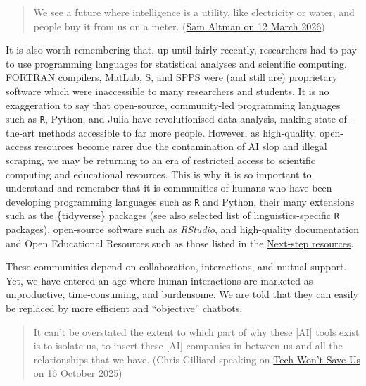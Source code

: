 \documentclass[
  letterpaper,
  DIV=11,
  numbers=noendperiod]{scrreprt}
\begin{document}
\begin{quote}
We see a future where intelligence is a utility, like electricity or
water, and people buy it from us on a meter.
(\href{https://www.youtube.com/watch?v=IWqve2SlIeY&t=350s}{Sam Altman on
12 March 2026})
\end{quote}

It is also worth remembering that, up until fairly recently, researchers
had to pay to use programming languages for statistical analyses and
scientific computing. FORTRAN compilers, MatLab, S, and SPPS were (and
still are) proprietary software which were inaccessible to many
researchers and students. It is no exaggeration to say that open-source,
community-led programming languages such as \texttt{R}, Python, and
Julia have revolutionised data analysis, making state-of-the-art methods
accessible to far more people. However, as high-quality, open-access
resources become rarer due the contamination of AI slop and illegal
scraping, we may be returning to an era of restricted access to
scientific computing and educational resources. This is why it is so
important to understand and remember that it is communities of humans
who have been developing programming languages such as \texttt{R} and
Python, their many extensions such as the \{tidyverse\} packages (see
also
\href{https://elenlefoll.github.io/RstatsTextbook/A_FurtherResources.html\#sec-LangSciPackages}{selected
list} of linguistics-specific \texttt{R} packages), open-source software
such as \emph{RStudio}, and high-quality documentation and Open
Educational Resources such as those listed in the
\href{https://elenlefoll.github.io/RstatsTextbook/A_FurtherResources.html\#further-open-educational-resources}{Next-step
resources}.

These communities depend on collaboration, interactions, and mutual
support. Yet, we have entered an age where human interactions are
marketed as unproductive, time-consuming, and burdensome. We are told
that they can easily be replaced by more efficient and ``objective''
chatbots.

\begin{quote}
It can't be overstated the extent to which part of why these {[}AI{]}
tools exist is to isolate us, to insert these {[}AI{]} companies in
between us and all the relationships that we have. (Chris Gilliard
speaking on
\href{https://techwontsave.us/episode/298_smart_glasses_are_ushering_in_an_anti_social_world_w_chris_gilliard}{Tech
Won't Save Us} on 16 October 2025)
\end{quote}
\end{document}
